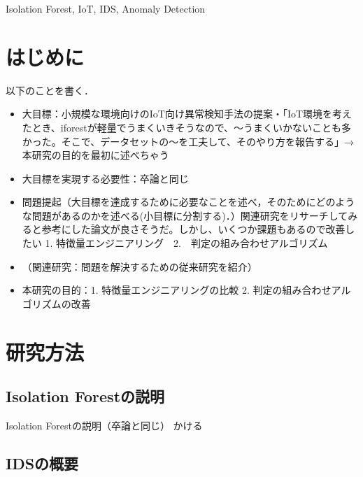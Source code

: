 \documentclass{css}
\begin{document}
\begin{ekeyword}
Isolation Forest, IoT, IDS, Anomaly Detection
\end{ekeyword}


\maketitle

\section{はじめに}
以下のことを書く．

\begin{itemize}
    \item 大目標：小規模な環境向けのIoT向け異常検知手法の提案・「IoT環境を考えたとき、iforestが軽量でうまくいきそうなので、〜うまくいかないことも多かった。そこで、データセットの〜を工夫して、そのやり方を報告する」→本研究の目的を最初に述べちゃう
    \item 大目標を実現する必要性：卒論と同じ
    \item 問題提起（大目標を達成するために必要なことを述べ，そのためにどのような問題があるのかを述べる(小目標に分割する)．）関連研究をリサーチしてみると参考にした論文が良さそうだ。しかし、いくつか課題もあるので改善したい
    1. 特徴量エンジニアリング　2.　判定の組み合わせアルゴリズム 
    \item （関連研究：問題を解決するための従来研究を紹介）
    \item 本研究の目的：1. 特徴量エンジニアリングの比較 2. 判定の組み合わせアルゴリズムの改善
\end{itemize}


\section{研究方法}

\subsection{Isolation Forestの説明}
Isolation Forestの説明（卒論と同じ）
かける

\subsection{IDSの概要}
\end{document}
